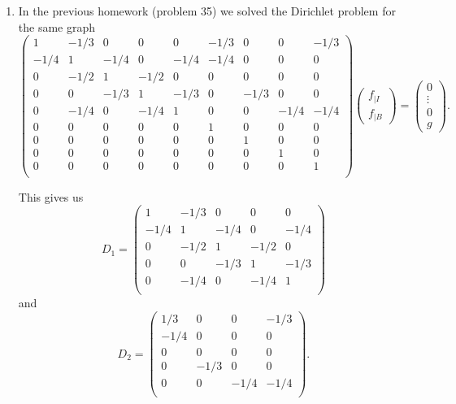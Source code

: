 \documentclass[12 pt, letterpaper]{hmcpset}
\begin{document}
\begin{solution}
\begin{enumerate}
			We know that $f_{\mid I}(i)$ is the $i$th entry of the column vector $L g$. But then, for our choice of $g$, $L g$ is just the $j$th column of $L$. Then, the probability that a random walk starting at the $i$th vertex first is the same as $f_{\mid I}(i)$ is the same as the $i$th entry of $Lg$, which ultimately is the same as the $(i, j)$th entry of $L$ as desired.

		\item In the previous homework (problem 35) we solved the Dirichlet problem for the same graph
			\[
		\begin{pmatrix}
			1 & -1/3 & 0 & 0 & 0 & -1/3 & 0 & 0 & -1/3 \\
			-1/4 & 1 & -1/4 & 0 & -1/4 & -1/4 & 0 & 0 & 0 \\
			0 & -1/2 & 1 & -1/2 & 0 & 0 & 0 & 0 & 0 \\
			0 & 0 & -1/3 & 1 & -1/3 & 0 & -1/3 & 0 & 0 \\
			0 & -1/4 & 0 & -1/4 & 1 & 0 & 0 & -1/4 & -1/4 \\
			0 & 0 & 0 & 0 & 0 & 1 & 0 & 0 & 0 \\
			0 & 0 & 0 & 0 & 0 & 0 & 1 & 0 & 0 \\
			0 & 0 & 0 & 0 & 0 & 0 & 0 & 1 & 0 \\
			0 & 0 & 0 & 0 & 0 & 0 & 0 & 0 & 1 \\
		\end{pmatrix} \begin{pmatrix}
			f_{\mid I} \\
			f_{\mid B}
		\end{pmatrix} = \begin{pmatrix}
			0 \\
			\vdots \\
			0 \\
			g
		\end{pmatrix}.
			\]

			This gives us
			\[
				D_{1} = \begin{pmatrix}
			1 & -1/3 & 0 & 0 & 0 \\
			-1/4 & 1 & -1/4 & 0 & -1/4 \\
			0 & -1/2 & 1 & -1/2 & 0 \\
			0 & 0 & -1/3 & 1 & -1/3 \\
			0 & -1/4 & 0 & -1/4 & 1 \\
		\end{pmatrix} 
		\]
		and
		\[
			D_{2} = \begin{pmatrix}
			1/3 & 0 & 0 & -1/3 \\
			-1/4 & 0 & 0 & 0 \\
			0 & 0 & 0 & 0 \\
			0 & -1/3 & 0 & 0 \\
			0 & 0 & -1/4 & -1/4 \\
		\end{pmatrix}.
			\]


\end{enumerate}
\end{solution}
\end{document}
